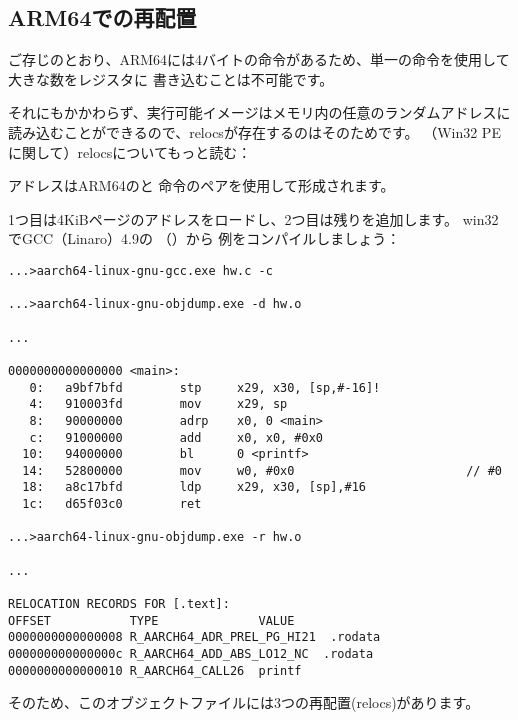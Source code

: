 ﻿\newcommand{\ARMELF}{\InSqBrackets{\emph{ELF for the ARM 64-bit Architecture (AArch64)}, (2013)}\footnote{\AlsoAvailableAs \url{http://infocenter.arm.com/help/topic/com.arm.doc.ihi0056b/IHI0056B_aaelf64.pdf}}}

\subsection{ARM64での再配置}
\label{ARM64_relocs}

ご存じのとおり、ARM64には4バイトの命令があるため、単一の命令を使用して大きな数をレジスタに
書き込むことは不可能です。

それにもかかわらず、実行可能イメージはメモリ内の任意のランダムアドレスに読み込むことができるので、relocsが存在するのはそのためです。
（Win32 PEに関して）relocsについてもっと読む：


アドレスはARM64のと \ADD 命令のペアを使用して形成されます。

1つ目は4KiBページのアドレスをロードし、2つ目は残りを追加します。
win32でGCC（Linaro）4.9の \q{\HelloWorldSectionName}（）から
例をコンパイルしましょう：

\begin{lstlisting}[caption=GCC (Linaro) 4.9 and objdump of object file,style=customasmARM]
...>aarch64-linux-gnu-gcc.exe hw.c -c

...>aarch64-linux-gnu-objdump.exe -d hw.o

...

0000000000000000 <main>:
   0:   a9bf7bfd        stp     x29, x30, [sp,#-16]!
   4:   910003fd        mov     x29, sp
   8:   90000000        adrp    x0, 0 <main>
   c:   91000000        add     x0, x0, #0x0
  10:   94000000        bl      0 <printf>
  14:   52800000        mov     w0, #0x0                        // #0
  18:   a8c17bfd        ldp     x29, x30, [sp],#16
  1c:   d65f03c0        ret

...>aarch64-linux-gnu-objdump.exe -r hw.o

...

RELOCATION RECORDS FOR [.text]:
OFFSET           TYPE              VALUE
0000000000000008 R_AARCH64_ADR_PREL_PG_HI21  .rodata
000000000000000c R_AARCH64_ADD_ABS_LO12_NC  .rodata
0000000000000010 R_AARCH64_CALL26  printf
\end{lstlisting}

そのため、このオブジェクトファイルには3つの再配置(relocs)があります。


